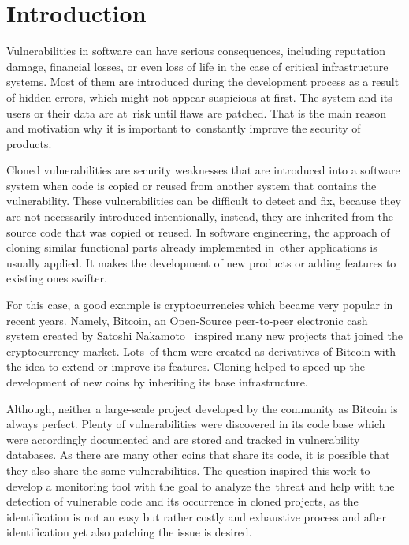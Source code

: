 \chapter{Introduction}
  Vulnerabilities in software can have serious consequences, including reputation damage,
  financial losses, or even loss of life in the case of critical infrastructure systems. Most of them
  are introduced during the development process as a result of hidden errors, which might not appear
  suspicious at first. The system and its users or their data are at~risk until flaws are patched.
  That is the main reason and motivation why it is important to~constantly improve the security of products.

  Cloned vulnerabilities are security weaknesses that are introduced into a software system
  when code is copied or reused from another system that contains the vulnerability.
  These vulnerabilities can be difficult to detect and fix, because they are not necessarily introduced
  intentionally, instead, they are inherited from the source code that was copied or reused. In software
  engineering, the approach of cloning similar functional parts already implemented in~other applications
  is usually applied. It makes the development of new products or adding features to existing ones swifter.

  For this case, a good example is cryptocurrencies which became very popular in recent years.
  Namely, Bitcoin, an Open-Source peer-to-peer electronic cash system created by Satoshi Nakamoto~\cite{bitcoin}
  inspired many new projects that joined the cryptocurrency market. Lots~of them were created
  as derivatives of Bitcoin with the idea to extend or improve its features. Cloning helped to speed up
  the development of new coins by inheriting its base infrastructure.

  Although, neither a large-scale project developed by the community as Bitcoin is always perfect. Plenty of
  vulnerabilities were discovered in its code base which were accordingly documented and are stored
  and tracked in vulnerability databases. As there are many other coins that share its code, it is possible
  that they also share the same vulnerabilities. The question inspired this work to develop a monitoring tool
  with the goal to analyze the~threat and help with the detection of vulnerable code and its occurrence in
  cloned projects, as the identification is not an easy but rather costly and exhaustive process
  and after identification yet also patching the issue is desired.

